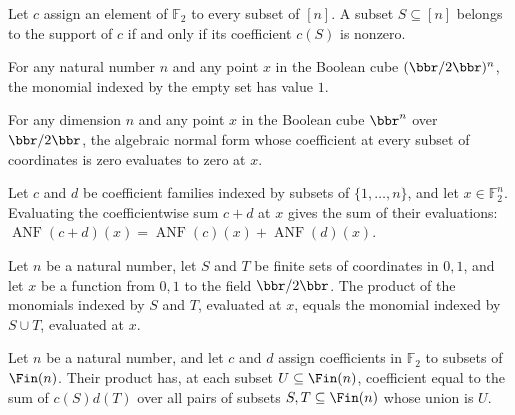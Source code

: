\begin{theorem}
\label{FABL.mem_anfSupport}
\leanok
{}
Let $c$ assign an element of $\mathbb F_2$ to every subset of $[n]$. A subset
$S\subseteq[n]$ belongs to the support of $c$ if and only if its coefficient $c(S)$ is
nonzero.
\end{theorem}

\begin{theorem}
\label{FABL.anfMonomial_empty}
\leanok
{}
For any natural number $n$ and any point $x$ in the Boolean cube $(\bbr/2\bbr)^n$, the
monomial indexed by the empty set has value $1$.
\end{theorem}

\begin{theorem}
\label{FABL.anfEval_zero}
\leanok
{}
For any dimension $n$ and any point $x$ in the Boolean cube $\bbr^n$ over $\bbr/2\bbr$, the
algebraic normal form whose coefficient at every subset of coordinates is zero evaluates
to zero at $x$.
\end{theorem}

\begin{theorem}
\label{FABL.anfEval_add}
\leanok
{}
Let $c$ and $d$ be coefficient families indexed by subsets of $\{1,\ldots,n\}$, and let
$x\in\mathbb{F}_2^n$. Evaluating the coefficientwise sum $c+d$ at $x$ gives the sum of
their evaluations:
$\operatorname{ANF}(c+d)(x)=\operatorname{ANF}(c)(x)+\operatorname{ANF}(d)(x)$.
\end{theorem}

\begin{theorem}
\label{FABL.anfMonomial_mul}
\leanok
{}
Let $n$ be a natural number, let $S$ and $T$ be finite sets of coordinates in $
{0,1}$, and let $x$ be a function from $
{0,1}$ to the field $\bbr/2\bbr$. The product of the monomials indexed by $S$ and $T$,
evaluated at $x$, equals the monomial indexed by $S\cup T$, evaluated at $x$.
\end{theorem}

\begin{definition}
\label{FABL.anfMul}
\leanok
{}
Let $n$ be a natural number, and let $c$ and $d$ assign coefficients in $\mathbb{F}_2$ to subsets
of $\Fin(n)$. Their product has, at each subset $U \subseteq \Fin(n)$, coefficient equal to the
sum of $c(S)d(T)$ over all pairs of subsets $S,T \subseteq \Fin(n)$ whose union is $U$.
\end{definition}

